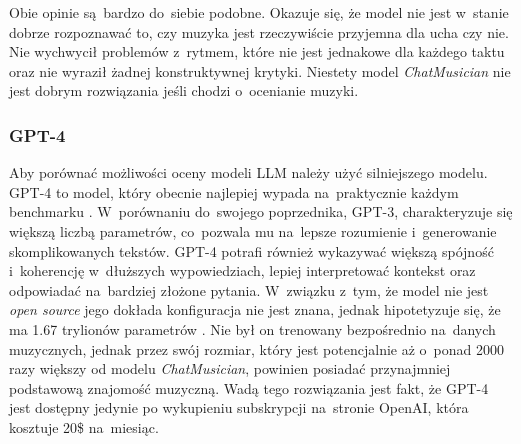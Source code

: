 \documentclass[data-science]{agh-wi} %
\begin{document}
Obie opinie są~bardzo do~siebie podobne. Okazuje się, że model nie jest w~stanie dobrze rozpoznawać to, czy muzyka jest rzeczywiście przyjemna dla ucha czy nie. Nie wychwycił problemów z~rytmem, które nie jest jednakowe dla każdego taktu oraz nie wyraził żadnej konstruktywnej krytyki. Niestety model \textit{ChatMusician} nie jest dobrym rozwiązania jeśli chodzi o~ocenianie muzyki.

\subsubsection*{GPT-4}
Aby porównać możliwości oceny modeli LLM należy użyć silniejszego modelu. GPT-4 to model, który obecnie najlepiej wypada na~praktycznie każdym benchmarku \cite{openai2024gpt4}. W~porównaniu do~swojego poprzednika, GPT-3, charakteryzuje się większą liczbą parametrów, co~pozwala mu na~lepsze rozumienie i~generowanie skomplikowanych tekstów. GPT-4 potrafi również wykazywać większą spójność i~koherencję w~dłuższych wypowiedziach, lepiej interpretować kontekst oraz odpowiadać na~bardziej złożone pytania. W~związku z~tym, że model nie jest \textit{open source} jego dokłada konfiguracja nie jest znana, jednak hipotetyzuje się, że ma 1.67 trylionów parametrów \cite{leakgpt4}. Nie był on trenowany bezpośrednio na~danych muzycznych, jednak przez swój rozmiar, który jest potencjalnie aż o~ponad 2000 razy większy od modelu \textit{ChatMusician}, powinien posiadać przynajmniej podstawową znajomość muzyczną. Wadą tego rozwiązania jest fakt, że GPT-4 jest dostępny jedynie po wykupieniu subskrypcji na~stronie OpenAI, która kosztuje 20\$ na~miesiąc.
\end{document}
